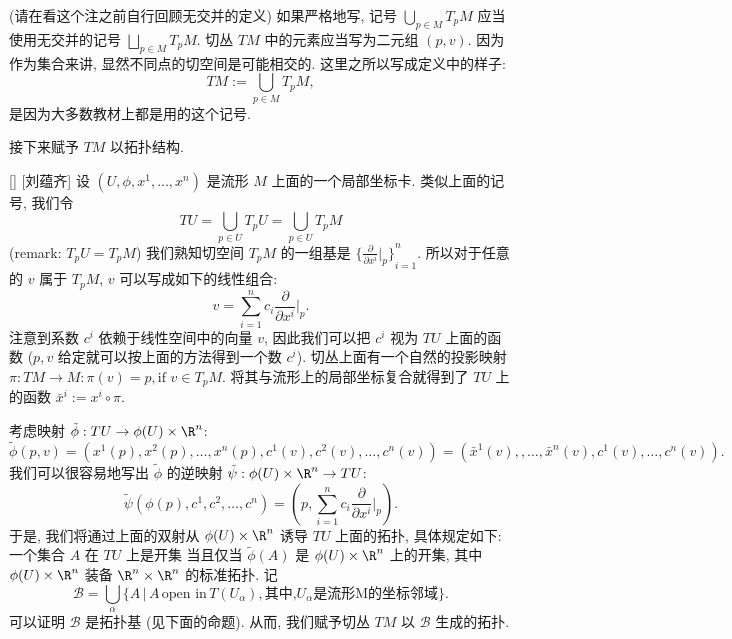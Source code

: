 \documentclass[UTF8]{ctexart}
\begin{document}
        \begin{rmk}
            []
            (请在看这个注之前自行回顾无交并的定义)
            如果严格地写, 记号 \(\displaystyle\bigcup_{p \in M} T_p M\) 应当使用无交并的记号 \(\displaystyle\bigsqcup_{p \in M} T_p M\).  
            切丛 \(T M\) 中的元素应当写为二元组 \((p, v)\). 
            因为作为集合来讲, 显然不同点的切空间是可能相交的. 
            这里之所以写成定义中的样子:
            \[
                TM:= \displaystyle\bigcup_{p \in M} T_p M,
            \]
            是因为大多数教材上都是用的这个记号. 
        \end{rmk}

        接下来赋予 \(TM\) 以拓扑结构. 

        \begin{dfn}
            [tangentbundle]
            {}
            []
            [刘蕴齐]
            设 \((U, \phi, x^1, \dots, x^n)\) 是流形 \(M\) 上面的一个局部坐标卡. 类似上面的记号, 我们令
            \[
                T U = \bigcup_{p \in U} T_p U = \bigcup_{p \in U} T_p M
            \]
            (remark:  \(T_p U = T_p M\)) 我们熟知切空间 \(T_p M\) 的一组基是 \( {\{ \frac{\partial}{\partial x^i} |_p \}}_{i=1}^n \). 所以对于任意的 \(v\) 属于 \(T_p M\),  \(v\) 可以写成如下的线性组合:
            \[
                v = \sum_{i=1}^n c_i \frac{\partial}{\partial x^i}|_p.
            \]
            注意到系数 \(c^i\) 依赖于线性空间中的向量 \(v\), 因此我们可以把 \(c^i\) 视为 \(T U\) 上面的函数 (\(p,v\) 给定就可以按上面的方法得到一个数 \(c^i\)). 
            切丛上面有一个自然的投影映射 \(\pi: T M \rightarrow M: \pi(v) = p, \text{if } v \in T_p M\). 将其与流形上的局部坐标复合就得到了 \(T U\) 上的函数 \(\bar{x}^i:= x^i \circ \pi\). 

            考虑映射 \(\tilde{\phi}: T U \rightarrow \phi(U) \times \R^n\):
            \[
                \tilde{\phi}(p,v) = (x^1(p),x^2(p), \dots, x^n(p),c^1(v),c^2(v),\dots,c^n(v))=(\bar{x}^1(v),,\dots,\bar{x}^n(v),c^1(v),\dots,c^n(v)).
            \]
            我们可以很容易地写出 \(\tilde{\phi}\) 的逆映射 \(\tilde{\psi}: \phi(U) \times \R^n \rightarrow T U\):
            \[
                \tilde{\psi}(\phi(p), c^1, c^2,\dots,c^n)
                = 
                (p, \sum_{i=1}^n c_i \frac{\partial}{\partial x^i}|_p).
            \]
            于是, 我们将通过上面的双射从 \(\phi(U) \times \R^n\) 诱导 \(T U\) 上面的拓扑, 具体规定如下: 一个集合 \(A\) 在 \(T U\) 上是开集 当且仅当  \(\tilde{\phi}(A)\) 是 \(\phi(U) \times \R^n\) 上的开集, 其中 \(\phi(U) \times \R^n\) 装备 \(\R^n \times \R^n\) 的标准拓扑. 
            记
            \[
                \mathcal{B} = \bigcup_{\alpha} \{ A \,|\, A \, \text{open in} \, T(U_{\alpha}), \text{其中,} U_{\alpha} \text{是流形M的坐标邻域} \}.
            \]
            可以证明 \(\mathcal{B}\) 是拓扑基 (见下面的命题). 从而, 我们赋予切丛 \(TM\) 以 \(\mathcal{B}\) 生成的拓扑. 
        \end{dfn}
\end{document}
